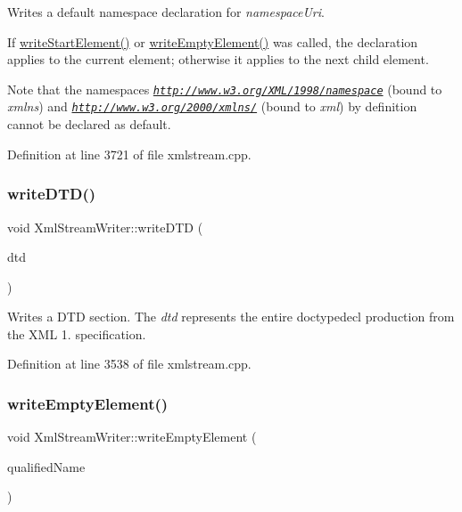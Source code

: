 Writes a default namespace declaration for {\itshape namespace\+Uri}.

If \hyperlink{class_xml_stream_writer_aa001c660c1df012b4e37773aa219c379}{write\+Start\+Element()} or \hyperlink{class_xml_stream_writer_a07e058f896327e9236e7c19132842cf2}{write\+Empty\+Element()} was called, the declaration applies to the current element; otherwise it applies to the next child element.

Note that the namespaces {\itshape \href{http://www.w3.org/XML/1998/namespace}{\tt http\+://www.\+w3.\+org/\+X\+M\+L/1998/namespace}} (bound to {\itshape xmlns}) and {\itshape \href{http://www.w3.org/2000/xmlns/}{\tt http\+://www.\+w3.\+org/2000/xmlns/}} (bound to {\itshape xml}) by definition cannot be declared as default. 

Definition at line 3721 of file xmlstream.\+cpp.

\mbox{\label{class_xml_stream_writer_a6e2b9fe72e7a85b044690cf41aee18fe}} 
\subsubsection{\texorpdfstring{write\+D\+T\+D()}{writeDTD()}}
{\footnotesize\ttfamily void Xml\+Stream\+Writer\+::write\+D\+TD (\begin{DoxyParamCaption}\item[{const Q\+String \&}]{dtd }\end{DoxyParamCaption})}

Writes a D\+TD section. The {\itshape dtd} represents the entire doctypedecl production from the X\+ML 1. specification. 

Definition at line 3538 of file xmlstream.\+cpp.

\mbox{\label{class_xml_stream_writer_a07e058f896327e9236e7c19132842cf2}} 
\subsubsection{\texorpdfstring{write\+Empty\+Element()}{writeEmptyElement()}\hspace{0.1cm}{\footnotesize\ttfamily [1/2]}}
{\footnotesize\ttfamily void Xml\+Stream\+Writer\+::write\+Empty\+Element (\begin{DoxyParamCaption}\item[{const Q\+String \&}]{qualified\+Name }\end{DoxyParamCaption})}

